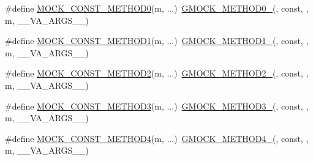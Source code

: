 \begin{DoxyCompactItemize}
\item 
\#define \mbox{\hyperlink{_obj__test_2lib_2googletest-release-1_88_81_2googlemock_2include_2gmock_2gmock-generated-function-mockers_8h_ac86e04e649fa8bf35b5f0149a13c935d}{M\+O\+C\+K\+\_\+\+C\+O\+N\+S\+T\+\_\+\+M\+E\+T\+H\+O\+D0}}(m, ...)~\mbox{\hyperlink{_obj__test_2lib_2googletest-release-1_88_81_2googlemock_2include_2gmock_2gmock-generated-function-mockers_8h_ae0d290ffa58d7c624b2e3487ba1252f4}{G\+M\+O\+C\+K\+\_\+\+M\+E\+T\+H\+O\+D0\+\_\+}}(, const, , m, \+\_\+\+\_\+\+V\+A\+\_\+\+A\+R\+G\+S\+\_\+\+\_\+)
\item 
\#define \mbox{\hyperlink{_obj__test_2lib_2googletest-release-1_88_81_2googlemock_2include_2gmock_2gmock-generated-function-mockers_8h_a6f76aeb56f492cfe538e177b6aa77965}{M\+O\+C\+K\+\_\+\+C\+O\+N\+S\+T\+\_\+\+M\+E\+T\+H\+O\+D1}}(m, ...)~\mbox{\hyperlink{_obj__test_2lib_2googletest-release-1_88_81_2googlemock_2include_2gmock_2gmock-generated-function-mockers_8h_a1bc0012d62440dda77208dabdf4925c9}{G\+M\+O\+C\+K\+\_\+\+M\+E\+T\+H\+O\+D1\+\_\+}}(, const, , m, \+\_\+\+\_\+\+V\+A\+\_\+\+A\+R\+G\+S\+\_\+\+\_\+)
\item 
\#define \mbox{\hyperlink{_obj__test_2lib_2googletest-release-1_88_81_2googlemock_2include_2gmock_2gmock-generated-function-mockers_8h_a31c489715704817a3f40d178404c61e8}{M\+O\+C\+K\+\_\+\+C\+O\+N\+S\+T\+\_\+\+M\+E\+T\+H\+O\+D2}}(m, ...)~\mbox{\hyperlink{_obj__test_2lib_2googletest-release-1_88_81_2googlemock_2include_2gmock_2gmock-generated-function-mockers_8h_a885295ca6bebb15efb3fc786218c5d47}{G\+M\+O\+C\+K\+\_\+\+M\+E\+T\+H\+O\+D2\+\_\+}}(, const, , m, \+\_\+\+\_\+\+V\+A\+\_\+\+A\+R\+G\+S\+\_\+\+\_\+)
\item 
\#define \mbox{\hyperlink{_obj__test_2lib_2googletest-release-1_88_81_2googlemock_2include_2gmock_2gmock-generated-function-mockers_8h_a9e67763df6705172e1a2ae92f1446bbc}{M\+O\+C\+K\+\_\+\+C\+O\+N\+S\+T\+\_\+\+M\+E\+T\+H\+O\+D3}}(m, ...)~\mbox{\hyperlink{_obj__test_2lib_2googletest-release-1_88_81_2googlemock_2include_2gmock_2gmock-generated-function-mockers_8h_af7c77ba511c631de02bb8c45a6ed3045}{G\+M\+O\+C\+K\+\_\+\+M\+E\+T\+H\+O\+D3\+\_\+}}(, const, , m, \+\_\+\+\_\+\+V\+A\+\_\+\+A\+R\+G\+S\+\_\+\+\_\+)
\item 
\#define \mbox{\hyperlink{_obj__test_2lib_2googletest-release-1_88_81_2googlemock_2include_2gmock_2gmock-generated-function-mockers_8h_a4614e9d6b24dff60c30dd4dedf494c6c}{M\+O\+C\+K\+\_\+\+C\+O\+N\+S\+T\+\_\+\+M\+E\+T\+H\+O\+D4}}(m, ...)~\mbox{\hyperlink{_obj__test_2lib_2googletest-release-1_88_81_2googlemock_2include_2gmock_2gmock-generated-function-mockers_8h_ab6430f2cfad9de4aca5258ea559294bb}{G\+M\+O\+C\+K\+\_\+\+M\+E\+T\+H\+O\+D4\+\_\+}}(, const, , m, \+\_\+\+\_\+\+V\+A\+\_\+\+A\+R\+G\+S\+\_\+\+\_\+)

\end{DoxyCompactItemize}
